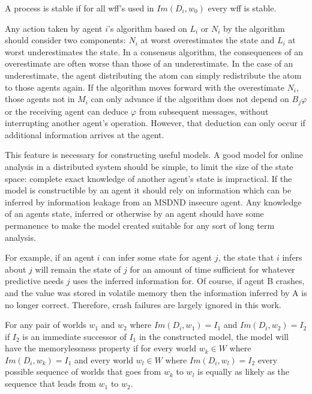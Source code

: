 \begin{pdef}
A process is stable if for all wff's used in $Im(D_i, w_0)$ every wff is stable.
\end{pdef}

Any action taken by agent $i$'s algorithm based on $L_i$ or $N_i$ by the algorithm should consider two components: $N_i$ at worst overestimates the state and $L_i$ at worst underestimates the state. In a consensus algorithm, the consequences of an overestimate are often worse than those of an underestimate. In the case of an underestimate, the agent distributing the atom can simply redistribute the atom to those agents again. If the algorithm moves forward with the overestimate $N_i$, those agents not in $M_i$ can only advance if the algorithm does not depend on $B_j \varphi$ or the receiving agent can deduce $\varphi$ from subsequent messages, without interrupting another agent's operation. However, that deduction can only occur if additional information arrives at the agent.

This feature is necessary for constructing useful models. A good model for online analysis in a distributed system should be simple, to limit the size of the state space: complete exact knowledge of another agent's state is impractical. If the model is constructible by an agent it should rely on information which can be inferred by information leakage from an MSDND insecure agent. Any knowledge of an agents state, inferred or otherwise by an agent should have some permanence to make the model created suitable for any sort of long term analysis. 

For example, if an agent $i$ can infer some state for agent $j$, the state that $i$ infers about $j$ will remain the state of $j$ for an amount of time sufficient for whatever predictive needs $j$ uses the inferred information for. Of course, if agent B crashes, and the value was stored in volatile memory then the information inferred by A is no longer correct. Therefore, crash failures are largely ignored in this work.


\begin{thm}
For any pair of worlds $w_1$ and $w_2$ where $Im(D_i, w_1)=I_1$ and $Im(D_i, w_2)=I_2$ if $I_2$ is an immediate successor of $I_1$ in the constructed model, the model will have the memorylessness property if for every world $w_k \in W$ where $Im(D_i, w_k)=I_1$ and every world $w_l \in W$ where $Im(D_i, w_l)=I_2$ every possible sequence of worlds that goes from $w_k$ to $w_l$ is equally as likely as the sequence that leads from $w_1$ to $w_2$. 
\end{thm}

